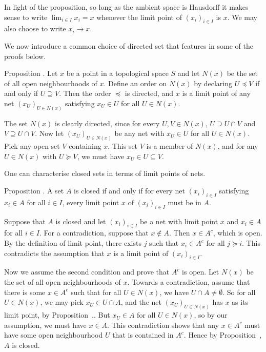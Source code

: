 In light of the proposition, so long as the ambient space is Hausdorff it makes sense to write
$\lim_{i\in I} x_i = x$ whenever the limit point of $(x_i)_{i\in I}$ is $x$. We may also choose
to write $x_i \to x$.

We now introduce a common choice of directed set that features in some of the proofs below.

\edef\propnbhdnet{\the\sectcount.\the\thmcount}
\proclaim Proposition \advthm.
Let $x$ be a point in a topological space $S$ and let $N(x)$ be the set of all open neighbourhoods
of $x$. Define an order on $N(x)$ by declaring $U\preceq V$ if and only if $U\supseteq V$. Then the order
$\preceq$ is directed, and $x$ is a limit point of any
net $(x_U)_{U\in N(x)}$ satisfying $x_U\in U$ for all $U\in N(x)$.

\proof The set $N(x)$ is clearly directed, since for every $U,V\in N(x)$,
$U \supseteq U\cap V$ and $V\supseteq U\cap V$. Now let $(x_U)_{U\in N(x)}$ be any net with
$x_U\in U$ for all $U\in N(x)$. Pick any open set $V$ containing $x$. This set $V$ is a member of
$N(x)$, and for any $U\in N(x)$ with $U\succeq V$, we must have $x_U\in U \subseteq V$.\slug

One can characterise closed sets in terms of limit points of nets.

\proclaim Proposition \advthm. A set $A$ is closed if and only if for every net
$(x_i)_{i\in I}$ satisfying $x_i\in A$ for all $i\in I$, every limit point $x$ of
$(x_i)_{i\in I}$
must be in $A$.

\proof Suppose that $A$ is closed and let $(x_i)_{i\in I}$ be a net with limit point $x$
and $x_i\in A$ for all $i\in I$. For a contradiction, suppose that $x\notin A$. Then $x \in A^c$,
which is open. By the definition of limit point, there exists $j$ such that $x_i\in A^c$ for all
$j\succeq i$. This contradicts the assumption that $x$ is a limit point of $(x_i)_{i\in I}$.

Now we assume the second condition and prove that $A^c$ is open.
Let $N(x)$ be the set of all open neighbourhoods of $x$.
Towards a contradiction, assume
that there is some $x\in A^c$ such that for all $U\in N(x)$, we have $U\cap A \ne \emptyset$.
So for all $U\in N(x)$, we may pick $x_U\in U\cap A$, and the net $(x_U)_{U\in N(x)}$
has $x$ as its limit point, by Proposition~{\propnbhdnet}. But $x_U\in A$ for all $U\in N(x)$,
so by our assumption, we must have $x\in A$. This contradiction shows that
any $x\in A^c$ must have some open neighbourhood $U$ that is contained in $A^c$. Hence by
Proposition~{\propopencriterion}, $A$ is closed.\slug

